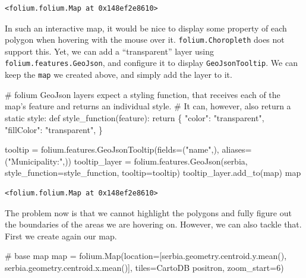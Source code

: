 \documentclass[
  letterpaper,
  DIV=11,
  numbers=noendperiod]{scrreprt}
\newenvironment{Shaded}{\begin{snugshade}}{\end{snugshade}}
\newcommand{\BuiltInTok}[1]{\textcolor[rgb]{0.00,0.23,0.31}{#1}}
\newcommand{\CommentTok}[1]{\textcolor[rgb]{0.37,0.37,0.37}{#1}}
\newcommand{\ControlFlowTok}[1]{\textcolor[rgb]{0.00,0.23,0.31}{#1}}
\newcommand{\DecValTok}[1]{\textcolor[rgb]{0.68,0.00,0.00}{#1}}
\newcommand{\KeywordTok}[1]{\textcolor[rgb]{0.00,0.23,0.31}{#1}}
\newcommand{\NormalTok}[1]{\textcolor[rgb]{0.00,0.23,0.31}{#1}}
\newcommand{\OperatorTok}[1]{\textcolor[rgb]{0.37,0.37,0.37}{#1}}
\newcommand{\StringTok}[1]{\textcolor[rgb]{0.13,0.47,0.30}{#1}}
\begin{document}
\begin{verbatim}
<folium.folium.Map at 0x148ef2e8610>
\end{verbatim}

In such an interactive map, it would be nice to display some property of
each polygon when hovering with the mouse over it.
\texttt{folium.Choropleth} does not support this. Yet, we can add a
``transparent'' layer using \texttt{folium.features.GeoJson}, and
configure it to display \texttt{GeoJsonTooltip}. We can keep the
\texttt{map} we created above, and simply add the layer to it.

\begin{Shaded}
\begin{Highlighting}[]
\CommentTok{\# folium GeoJson layers expect a styling function, that receives each of the map’s feature and returns  an individual style. }
\CommentTok{\# It can, however, also return a static style:}
\KeywordTok{def}\NormalTok{ style\_function(feature):}
    \ControlFlowTok{return}\NormalTok{ \{}
        \StringTok{"color"}\NormalTok{: }\StringTok{"transparent"}\NormalTok{,}
        \StringTok{"fillColor"}\NormalTok{: }\StringTok{"transparent"}\NormalTok{,}
\NormalTok{    \}}

\NormalTok{tooltip }\OperatorTok{=}\NormalTok{ folium.features.GeoJsonTooltip(fields}\OperatorTok{=}\NormalTok{(}\StringTok{"name"}\NormalTok{,), aliases}\OperatorTok{=}\NormalTok{(}\StringTok{"Municipality:"}\NormalTok{,))}
\NormalTok{tooltip\_layer }\OperatorTok{=}\NormalTok{ folium.features.GeoJson(serbia, style\_function}\OperatorTok{=}\NormalTok{style\_function, tooltip}\OperatorTok{=}\NormalTok{tooltip)}
\NormalTok{tooltip\_layer.add\_to(}\BuiltInTok{map}\NormalTok{)}
\BuiltInTok{map}
\end{Highlighting}
\end{Shaded}

\begin{verbatim}
<folium.folium.Map at 0x148ef2e8610>
\end{verbatim}

The problem now is that we cannot highlight the polygons and fully
figure out the boundaries of the areas we are hovering on. However, we
can also tackle that. First we create again our map.

\begin{Shaded}
\begin{Highlighting}[]
\CommentTok{\# base map}
\BuiltInTok{map} \OperatorTok{=}\NormalTok{ folium.Map(location}\OperatorTok{=}\NormalTok{[serbia.geometry.centroid.y.mean(), serbia.geometry.centroid.x.mean()], tiles}\OperatorTok{=}\StringTok{\textquotesingle{}CartoDB positron\textquotesingle{}}\NormalTok{, zoom\_start}\OperatorTok{=}\DecValTok{6}\NormalTok{)}
\end{Highlighting}
\end{Shaded}
\end{document}
